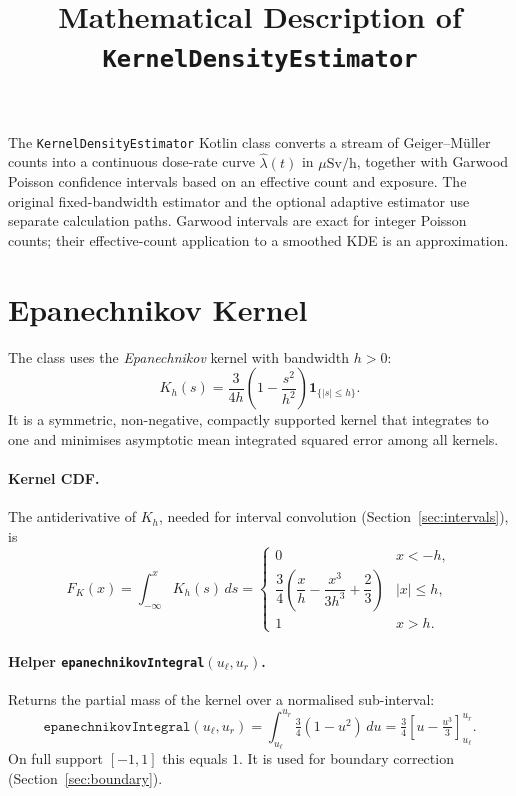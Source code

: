 \documentclass[11pt,a4paper]{article}
\title{Mathematical Description of \texttt{KernelDensityEstimator}}
\author{}
\date{}
\newcommand{\h}{h}                   %
\begin{document}
\maketitle
\tableofcontents
\bigskip

\noindent
The \texttt{KernelDensityEstimator} Kotlin class converts a stream of
Geiger--Müller counts into a continuous dose-rate curve
$\hat\lambda(t)$ in $\mu\mathrm{Sv/h}$, together with Garwood Poisson
confidence intervals based on an effective count and exposure.  The original
fixed-bandwidth estimator and the optional adaptive estimator use separate
calculation paths.  Garwood intervals are exact for integer Poisson counts;
their effective-count application to a smoothed KDE is an approximation.

\section{Epanechnikov Kernel}

The class uses the \emph{Epanechnikov} kernel with bandwidth $\h > 0$:
\begin{equation}
  K_\h(s) = \frac{3}{4\h}\!\left(1 - \frac{s^2}{\h^2}\right)
             \mathbf{1}_{\{|s|\le\h\}}.
  \label{eq:kernel}
\end{equation}
It is a symmetric, non-negative, compactly supported kernel that integrates to
one and minimises asymptotic mean integrated squared error among all kernels.

\paragraph{Kernel CDF.}
The antiderivative of $K_\h$, needed for interval convolution (Section~\ref{sec:intervals}), is
\begin{equation}
  F_K(x) = \int_{-\infty}^{x} K_\h(s)\,ds =
  \begin{cases}
    0 & x < -\h, \\[4pt]
    \dfrac{3}{4}\!\left(\dfrac{x}{\h} - \dfrac{x^3}{3\h^3} + \dfrac{2}{3}\right)
      & |x| \le \h, \\[4pt]
    1 & x > \h.
  \end{cases}
  \label{eq:Fk}
\end{equation}

\paragraph{Helper \texttt{epanechnikovIntegral}$(u_{\ell}, u_r)$.}
Returns the partial mass of the kernel over a normalised sub-interval:
\begin{equation}
  \texttt{epanechnikovIntegral}(u_\ell, u_r)
    = \int_{u_\ell}^{u_r} \tfrac{3}{4}(1 - u^2)\,du
    = \tfrac{3}{4}\!\left[u - \tfrac{u^3}{3}\right]_{u_\ell}^{u_r}.
  \label{eq:epInt}
\end{equation}
On full support $[-1,1]$ this equals $1$.  It is used for boundary correction
(Section~\ref{sec:boundary}).
\end{document}

